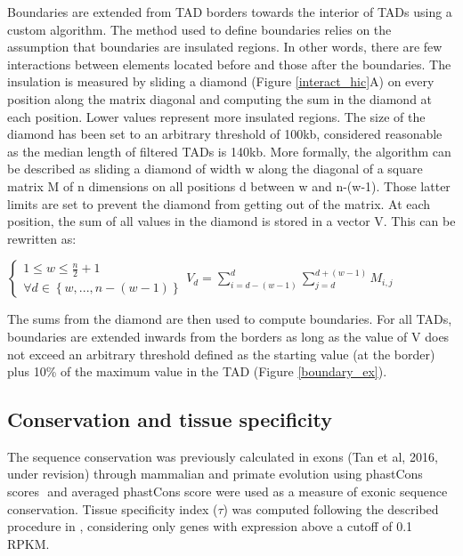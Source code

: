 \documentclass[11pt,a4paper]{report}
\begin{document}
Boundaries are extended from TAD borders towards the interior of TADs using a custom algorithm. The method used to define boundaries relies on the assumption that boundaries are insulated regions. In other words, there are few interactions between elements located before and those after the boundaries. The insulation is measured by sliding a diamond (Figure \ref{interact_hic}A) on every position along the matrix diagonal and computing the sum in the diamond at each position. Lower values represent more insulated regions. The size of the diamond has been set to an arbitrary threshold of 100kb, considered reasonable as the median length of filtered TADs is 140kb. 
More formally, the algorithm can be described as sliding a diamond of width w  along the diagonal of a square matrix M of n dimensions on all positions d between w and n-(w-1). Those latter limits are set to prevent the diamond from getting out of the matrix. At each position, the sum of all values in the diamond is stored in a vector V. This can be rewritten as: 

\vspace{0.2in}
$\left\{\begin{matrix}1\leq w\leq \frac{n}{2}+1 \\ \forall d\in\left \{ w , ... , n-\left ( w-1 \right ) \right \}\end{matrix}\right. V_{d}=\sum_{i=d-(w-1)}^{d}\sum_{j=d}^{d+(w-1)}M_{i,j}$
\vspace{0.2in}

\noindent The sums from the diamond are then used to compute boundaries. For all TADs, boundaries are extended inwards from the borders as long as the value of V does not exceed an arbitrary threshold defined as the starting value (at the border) plus 10\% of the maximum value in the TAD (Figure \ref{boundary_ex}).

\subsection*{Conservation and tissue specificity}

The sequence conservation was previously calculated in exons (Tan et al, 2016, under revision) through mammalian and primate evolution using phastCons scores \cite{Siepel2005}⁠ and averaged phastCons score were used as a measure of exonic sequence conservation. Tissue specificity index ($\tau$) was computed following the described procedure in \cite{Kryuchkova2015a}, considering only genes with expression above a cutoff of 0.1 RPKM.
\end{document}
